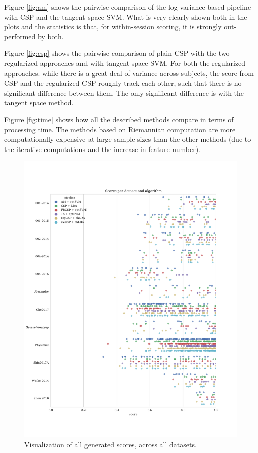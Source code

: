 Figure \ref{fig:am} shows the pairwise comparison of the log
variance-based pipeline with CSP and the tangent space SVM. What is
very clearly shown both in the plots and the statistics is that, for
within-session scoring, it is strongly out-performed by both.

Figure \ref{fig:csp} shows the pairwise comparison of 
plain CSP with the two regularized approaches and with
tangent space SVM. For both the regularized approaches. while there is
a great deal of variance across subjects, the score from CSP and the
regularized CSP roughly track each other, such that there is no
significant difference between them. The only significant difference
is with the tangent space method.

Figure \ref{fig:time} shows how all the described methods compare in terms of
processing time. The methods based on Riemannian computation are more
computationally expensive at large sample sizes than the other methods (due to
the iterative computations and the increase in feature number).

\begin{figure}
    \centering
    \includegraphics[width=\textwidth]{Figures/scores.pdf}
    \caption{Visualization of all generated scores, across all datasets.}
    \label{fig:all}
\end{figure}


